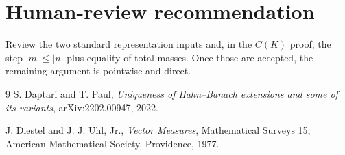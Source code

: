\documentclass[11pt]{article}
\begin{document}
\section*{Human-review recommendation}

Review the two standard representation inputs and, in the $C(K)$ proof, the
step $|m|\leq|n|$ plus equality of total masses. Once those are accepted, the
remaining argument is pointwise and direct.

\begin{thebibliography}{9}
S. Daptari and T. Paul,
\emph{Uniqueness of Hahn--Banach extensions and some of its variants},
arXiv:2202.00947, 2022.

J. Diestel and J. J. Uhl, Jr.,
\emph{Vector Measures}, Mathematical Surveys 15,
American Mathematical Society, Providence, 1977.
\end{thebibliography}
\end{document}
